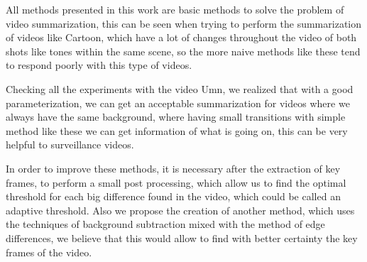 \documentclass[journal]{IEEEtran}
\begin{document}

All methods presented in this work are basic methods to solve the problem of video summarization, this can be seen when trying to perform the summarization of videos like Cartoon, which have a lot of changes throughout the video of both shots like tones within the same scene, so the more naive methods like these tend to respond poorly with this type of videos.



Checking all the experiments with the video Umn, we realized that with a good parameterization, we can get an acceptable summarization for videos where we always have the same background, where having small transitions with simple method like these we can get information of what is going on, this can be very helpful to surveillance videos.


In order to improve these methods, it is necessary after the extraction of key frames, to perform a small post processing, which allow us to find the optimal threshold for each big difference found in the video, which could be called an adaptive threshold.
Also we propose the creation of another method, which uses the techniques of background subtraction mixed with the method of edge differences, we believe that this would allow to find with better certainty the key frames of the video.
\end{document}
